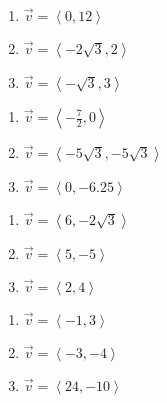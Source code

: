 \begin{multicols}{3}

\begin{enumerate}

\setcounter{enumi}{\value{HW}}

\item $\vec{v} = \left<0,12\right>$
\item $\vec{v} = \left<-2\sqrt{3}, 2\right>$
\item $\vec{v} = \left<-\sqrt{3}, 3\right>$

\setcounter{HW}{\value{enumi}}

\end{enumerate}

\end{multicols}

\begin{multicols}{3}

\begin{enumerate}

\setcounter{enumi}{\value{HW}}

\item $\vec{v} = \left<-\frac{7}{2}, 0\right>$
\item $\vec{v} = \left<-5\sqrt{3}, -5\sqrt{3}\right>$
\item $\vec{v} = \left<0, -6.25\right>$

\setcounter{HW}{\value{enumi}}

\end{enumerate}

\end{multicols}

\begin{multicols}{3}

\begin{enumerate}

\setcounter{enumi}{\value{HW}}

\item $\vec{v} = \left<6, -2\sqrt{3}\right>$
\item $\vec{v} = \left<5, -5\right>$
\item $\vec{v} = \left<2,4\right>$

\setcounter{HW}{\value{enumi}}

\end{enumerate}

\end{multicols}

\begin{multicols}{3}

\begin{enumerate}

\setcounter{enumi}{\value{HW}}

\item $\vec{v} = \left<-1, 3\right>$
\item $\vec{v} = \left<-3, -4\right>$
\item $\vec{v} = \left<24, -10\right>$

\setcounter{HW}{\value{enumi}}

\end{enumerate}

\end{multicols}

